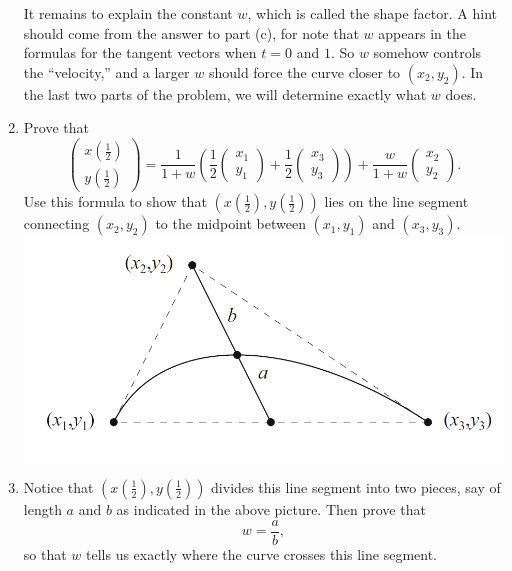 \begin{exercise}{16}
\begin{enumerate}
        It remains to explain the constant $w$, which is called the shape factor. A hint should come from the answer to part (c), for note that $w$ appears in the formulas for the tangent vectors when $t=0$ and $1$. So $w$ somehow controls the ``velocity,'' and a larger $w$ should force the curve closer to $(x_2,y_2)$. In the last two parts of the problem, we will determine exactly what $w$ does.
        \item Prove that
        $$\left(\begin{array}{c}x\left(\frac{1}{2}\right)\\ y\left(\frac{1}{2}\right)\end{array}\right) = \frac{1}{1+w}\left(\frac{1}{2}\left(\begin{array}{c}x_1\\ y_1\end{array}\right) + \frac{1}{2}\left(\begin{array}{c}x_3\\ y_3\end{array}\right) \right) + \frac{w}{1+w}\left(\begin{array}{c}x_2\\ y_2\end{array}\right).$$
        Use this formula to show that $\left(x\left(\frac{1}{2}\right),y\left(\frac{1}{2}\right)\right)$ lies on the line segment connecting $(x_2,y_2)$ to the midpoint between $(x_1,y_1)$ and $(x_3,y_3)$.\\
        \includegraphics[width=0.8\linewidth]{cox-little-oshea/ch1/assets/sec1-3-ex16a.png}
        \item Notice that $\left(x\left(\frac{1}{2}\right), y\left(\frac{1}{2}\right)\right)$ divides this line segment into two pieces, say of length $a$ and $b$ as indicated in the above picture. Then prove that
        $$w = \frac{a}{b},$$
        so that $w$ tells us exactly where the curve crosses this line segment.
    \end{enumerate}
\end{exercise}
